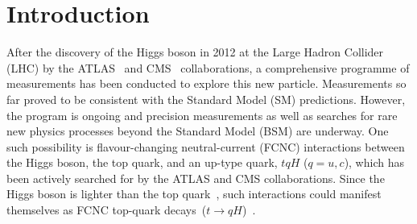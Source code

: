 \documentclass[PAPER, coverpage, atlasdraft=true, texlive=2016, UKenglish]{\ATLASLATEXPATH atlasdoc} %
\providecommand{\DIFaddbegin}{} %
\providecommand{\DIFaddend}{} %
\begin{document}
\maketitle

\DIFaddbegin \tableofcontents
\DIFaddend 

\section{Introduction}
\label{sec:intro}
After the discovery of the Higgs boson in 2012 at the Large Hadron Collider (LHC) by the ATLAS~\cite{Aad:2012tfa} and 
CMS~\cite{Chatrchyan:2012ufa} collaborations, 
a comprehensive programme of measurements %
has been conducted to explore this new particle. Measurements so far proved to be consistent with the Standard Model (SM) predictions. 
However, the program is ongoing and precision measurements as well as searches for rare new physics processes beyond the Standard Model (BSM)
are underway. One such possibility is flavour-changing neutral-current (FCNC) interactions between the Higgs boson, 
the top quark, and an up-type quark, $tqH$ ($q=u, c$), which has been actively searched for by the ATLAS and CMS collaborations.  
Since the Higgs boson is lighter than the top quark~\cite{Aad:2015zhl},
such interactions could manifest themselves as FCNC top-quark decays~($t\to qH$)~\cite{Agashe:2013hma}.
\end{document}
